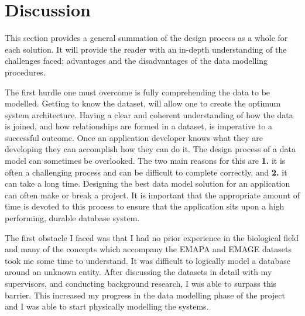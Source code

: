 \newpage
\section{Discussion}\label{designdiscussion}
This section provides a general summation of the design process as a whole for each solution. It will provide the reader with an in-depth understanding of the challenges faced; advantages and the disadvantages of the data modelling procedures.

The first hurdle one must overcome is fully comprehending the data to be modelled. Getting to know the dataset, will allow one to create the optimum system architecture. Having a clear and coherent understanding of how the data is joined, and how relationships are formed in a dataset, is imperative to a successful outcome. Once an application developer knows what they are developing they can accomplish how they can do it. The design process of a data model can sometimes be overlooked. The two main reasons for this are \textbf{1.} it is often a challenging process and can be difficult to complete correctly, and \textbf{2.} it can take a long time. Designing the best data model solution for an application can often make or break a project. It is important that the appropriate amount of time is devoted to this process to ensure that the application sits upon a high performing, durable database system.

The first obstacle I faced was that I had no prior experience in the biological field and many of the concepts which accompany the EMAPA and EMAGE datasets took me some time to understand. It was difficult to logically model a database around an unknown entity. After discussing the datasets in detail with my supervisors, and conducting background research, I was able to surpass this barrier. This increased my progress in the data modelling phase of the project and I was able to start physically modelling the systems.

